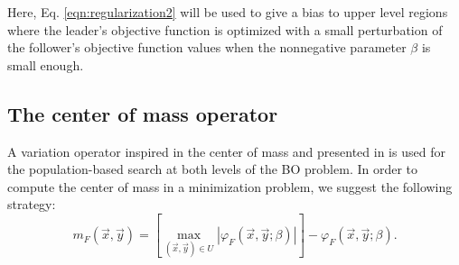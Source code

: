 \documentclass[conference]{IEEEtran}
\theoremstyle{definition}
\begin{document}
Here, Eq. \ref{eqn:regularization2} will be used to give a bias to upper level
regions where the leader's objective function is optimized with a small perturbation
of the follower's objective function values when the nonnegative parameter $\beta$
is small enough. 



\subsection{The center of mass operator} %
\label{sub:the_center_operator}
% 

A variation operator inspired in the center of mass and presented in \cite{Mejia2018}
is used for the population-based search at both levels of the BO problem. In order
to compute the center of mass in a minimization problem, we suggest the following
strategy:
% 
\[
    m_F(\vec{x}, \vec{y}) = \left[ \max_{(\vec{x}, \vec{y})\in U} |\varphi_F (\vec{x}, \vec{y}; \beta)| \right]
                            - \varphi_F (\vec{x}, \vec{y}; \beta).
\]
\end{document}
